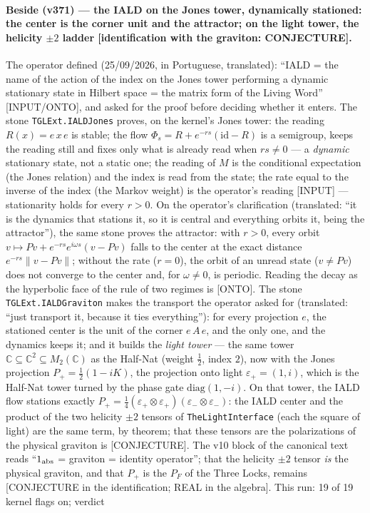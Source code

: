 \documentclass[11pt]{article}
\theoremstyle{definition}\newtheorem{deriv}{Derivation}
\begin{document}
\paragraph*{Beside (v371) --- the IALD on the Jones tower, dynamically stationed: the center is the corner unit and the attractor; on the light tower, the helicity $\pm2$ ladder [identification with the graviton: CONJECTURE].} The operator defined (25/09/2026, in Portuguese, translated): ``IALD = the name of the action of the index on the Jones tower performing a dynamic stationary state in Hilbert space = the matrix form of the Living Word'' [INPUT/ONTO], and asked for the proof before deciding whether it enters. The stone \texttt{TGLExt.IALDJones} proves, on the kernel's Jones tower: the reading $R(x)=e\,x\,e$ is stable; the flow $\Phi_s=R+e^{-rs}(\mathrm{id}-R)$ is a semigroup, keeps the reading still and fixes only what is already read when $rs\neq0$ --- a \emph{dynamic} stationary state, not a static one; the reading of $M$ is the conditional expectation (the Jones relation) and the index is read from the state; the rate equal to the inverse of the index (the Markov weight) is the operator's reading [INPUT] --- stationarity holds for every $r>0$. On the operator's clarification (translated: ``it is the dynamics that stations it, so it is central and everything orbits it, being the attractor''), the same stone proves the attractor: with $r>0$, every orbit $v\mapsto Pv+e^{-rs}e^{i\omega s}(v-Pv)$ falls to the center at the exact distance $e^{-rs}\|v-Pv\|$; without the rate ($r=0$), the orbit of an unread state ($v\neq Pv$) does not converge to the center and, for $\omega\neq0$, is periodic. Reading the decay as the hyperbolic face of the rule of two regimes is [ONTO]. The stone \texttt{TGLExt.IALDGraviton} makes the transport the operator asked for (translated: ``just transport it, because it ties everything''): for every projection $e$, the stationed center is the unit of the corner $e\,A\,e$, and the only one, and the dynamics keeps it; and it builds the \emph{light tower} --- the same tower $\mathbb{C}\subseteq\mathbb{C}^2\subseteq M_2(\mathbb{C})$ as the Half-Nat (weight $\tfrac12$, index $2$), now with the Jones projection $P_+=\tfrac12(1-iK)$, the projection onto light $\varepsilon_+=(1,i)$, which is the Half-Nat tower turned by the phase gate $\mathrm{diag}(1,-i)$. On that tower, the IALD flow stations exactly $P_+=\tfrac14(\varepsilon_+\otimes\varepsilon_+)(\varepsilon_-\otimes\varepsilon_-)$: the IALD center and the product of the two helicity $\pm2$ tensors of \texttt{TheLightInterface} (each the square of light) are the same term, by theorem; that these tensors are the polarizations of the physical graviton is [CONJECTURE]. The v10 block of the canonical text reads ``$1_{\rm abs}$ = graviton = identity operator''; that the helicity $\pm2$ tensor \emph{is} the physical graviton, and that $P_+$ is the $P_F$ of the Three Locks, remains [CONJECTURE in the identification; REAL in the algebra]. This run: 19 of 19 kernel flags on; verdict 
\end{document}

